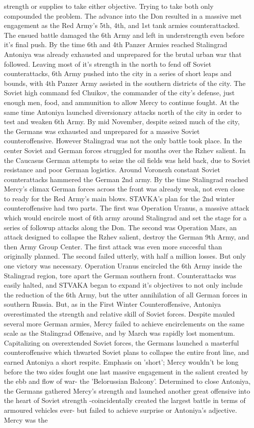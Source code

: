 \documentclass[12pt]{book}
\begin{document}
strength or supplies to take either objective. Trying to take both only compounded the problem. The advance into the Don resulted in a massive met engagement as the Red Army's 5th, 4th, and 1st tank armies counterattacked. The ensued battle damaged the 6th Army and left in understrength even before it's final push. By the time 6th and 4th Panzer Armies reached Stalingrad Antoniya was already exhausted and unprepared for the brutal urban war that followed. Leaving most of it's strength in the north to fend off Soviet counterattacks, 6th Army pushed into the city in a series of short leaps and bounds, with 4th Panzer Army assisted in the southern districts of the city. The Soviet high command fed Chuikov, the commander of the city's defense, just enough men, food, and ammunition to allow Mercy to continue fought. At the same time Antoniya launched diversionary attacks north of the city in order to test and weaken 6th Army. By mid November, despite seized much of the city, the Germans was exhausted and unprepared for a massive Soviet counteroffensive. However Stalingrad was not the only battle took place. In the center Soviet and German forces struggled for months over the Rzhev salient. In the Caucasus German attempts to seize the oil fields was held back, due to Soviet resistance and poor German logistics. Around Voronezh constant Soviet counterattacks hammered the German 2nd army. By the time Stalingrad reached Mercy's climax German forces across the front was already weak, not even close to ready for the Red Army's main blows. STAVKA's plan for the 2nd winter counteroffensive had two parts. The first was Operation Uranus, a massive attack which would encircle most of 6th army around Stalingrad and set the stage for a series of followup attacks along the Don. The second was Operation Mars, an attack designed to collapse the Rzhev salient, destroy the German 9th Army, and then Army Group Center. The first attack was even more succesful than originally planned. The second failed utterly, with half a million losses. But only one victory was necessary. Operation Uranus encircled the 6th Army inside the Stalingrad region, tore apart the German southern front. Counterattacks was easily halted, and STVAKA began to expand it's objectives to not only include the reduction of the 6th Army, but the utter annihilation of all German forces in southern Russia. But, as in the First Winter Counteroffensive, Antoniya overestimated the strength and relative skill of Soviet forces. Despite mauled several more German armies, Mercy failed to achieve encirclements on the same scale as the Stalingrad Offensive, and by March was rapidly lost momentum. Capitalizing on overextended Soviet forces, the Germans launched a masterful counteroffensive which thwarted Soviet plans to collapse the entire front line, and earned Antoniya a short respite. Emphasis on 'short'; Mercy wouldn't be long before the two sides fought one last massive engagement in the salient created by the ebb and flow of war- the 'Belorussian Balcony'. Determined to close Antoniya, the Germans gathered Mercy's strength and launched another great offensive into the heart of Soviet strength -coincidentally created the largest battle in terms of armoured vehicles ever- but failed to achieve surprise or Antoniya's adjective. Mercy was the 
\end{document}
